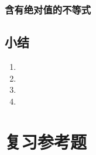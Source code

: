 \subsection{含有绝对值的不等式}
\begin{Practice}
  \begin{question}
    \item 
    \item 
    \item 
    \item 
    \item 
  \end{question}
\end{Practice}

\begin{Exercise}
  \begin{question}
    \item 
    \item 
    \item 
    \item 
    \item 
    \item 
    \item 
    \item 
    \item 
    \item 
    \item 
    \item 
    \item 
    \item 
  \end{question}
\end{Exercise}

\section*{小结}
\begin{enumerate}[C、,itemindent=4.5em]
  \item 
  \item 
  \item 
  \item 
\end{enumerate}
\chapter*{复习参考题}
